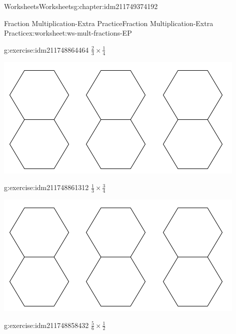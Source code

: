 \documentclass[twoside,11pt,]{book}
\begin{document}
\begin{chapterptx}{Worksheets}{}{Worksheets}{}{}{g:chapter:idm211749374192}
\begin{worksheet-section-numberless}{Fraction Multiplication-Extra Practice}{}{Fraction Multiplication-Extra Practice}{}{}{x:worksheet:ws-mult-fractions-EP}
\begin{introduction}{}
\end{introduction}%
\begin{divisionexercise}{3}{}{}{g:exercise:idm211748864464}%
\(\frac{2}{3} \times \frac{1}{4} \)%
\begin{sidebyside}{1}{0.1}{0.1}{0}%
\begin{sbspanel}{0.8}%
\includegraphics[width=1\linewidth]{images/3-double-hexagons.png}
\end{sbspanel}%
\end{sidebyside}%
\end{divisionexercise}%
\clearpage
\begin{divisionexercise}{4}{}{}{g:exercise:idm211748861312}%
\(\frac{1}{3} \times \frac{3}{4} \)%
\begin{sidebyside}{1}{0.1}{0.1}{0}%
\begin{sbspanel}{0.8}%
\includegraphics[width=1\linewidth]{images/3-double-hexagons.png}
\end{sbspanel}%
\end{sidebyside}%
\end{divisionexercise}%
\begin{divisionexercise}{5}{}{}{g:exercise:idm211748858432}%
\(\frac{5}{6} \times \frac{1}{2} \)%
\begin{sidebyside}{1}{0.1}{0.1}{0}%
\begin{sbspanel}{0.8}%

\end{sbspanel}
\end{sidebyside}
\end{divisionexercise}
\end{worksheet-section-numberless}
\end{chapterptx}
\end{document}
